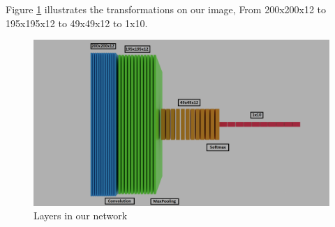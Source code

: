 \documentclass[conference]{IEEEtran}
\begin{document}



Figure \ref{fig: layers} illustrates the transformations on our image,
From 200x200x12 to 195x195x12 to 49x49x12 to 1x10.

\begin{figure}[h]
  \centering
  \includegraphics[scale=0.2]{images/layers_image.png}
  \caption{Layers in our network\cite{Blender_Aug2021}}
  \label{fig: layers}
\end{figure}
\end{document}
